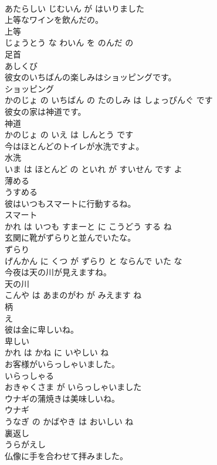 \documentclass[8pt]{extreport}
\begin{document}
\begin{CJK}{UTF8}{min}
\\	あたらしい じむいん が はいりました			
\\	上等なワインを飲んだの。	
\\	上等 
\\	じょうとう な わいん を のんだ の			
\\	足首	
\\	あしくび		
\\	彼女のいちばんの楽しみはショッピングです。	
\\	ショッピング 
\\	かのじょ の いちばん の たのしみ は しょっぴんぐ です			
\\	彼女の家は神道です。	
\\	神道 
\\	かのじょ の いえ は しんとう です			
\\	今はほとんどのトイレが水洗ですよ。	
\\	水洗 
\\	いま は ほとんど の といれ が すいせん です よ			
\\	薄める	
\\	うすめる		
\\	彼はいつもスマートに行動するね。	
\\	スマート 
\\	かれ は いつも すまーと に こうどう する ね			
\\	玄関に靴がずらりと並んでいたな。	
\\	ずらり 
\\	げんかん に くつ が ずらり と ならんで いた な			
\\	今夜は天の川が見えますね。	
\\	天の川 
\\	こんや は あまのがわ が みえます ね			
\\	柄	
\\	え		
\\	彼は金に卑しいね。	
\\	卑しい 
\\	かれ は かね に いやしい ね			
\\	お客様がいらっしゃいました。	
\\	いらっしゃる 
\\	おきゃくさま が いらっしゃいました			
\\	ウナギの蒲焼きは美味しいね。	
\\	ウナギ 
\\	うなぎ の かばやき は おいしい ね			
\\	裏返し	
\\	うらがえし		
\\	仏像に手を合わせて拝みました。	

\end{CJK}
\end{document}

